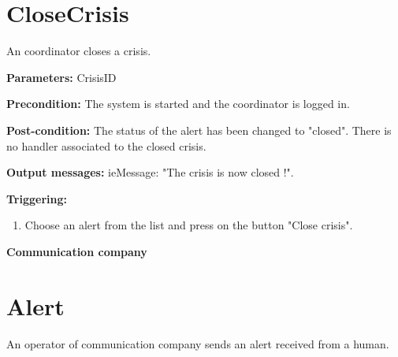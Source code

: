 \section{CloseCrisis}
\label{operation:CloseCrisis}

An coordinator closes a crisis.

\begin{description}
	\item \textbf{Parameters:} CrisisID
	\item \textbf{Precondition:} The system is started and the coordinator is
	logged in.
	\item \textbf{Post-condition:} The status of the alert has been changed to
	"closed". There is no handler associated to the closed crisis.
	\item \textbf{Output messages:} ieMessage: "The crisis is now closed !".
	
	\item \textbf{Triggering:}
	
	\begin{enumerate}
		\item Choose an alert from the list and press on the button "Close crisis".
	\end{enumerate}
\end{description}


\begin{center}
	{\bf \Large Communication company}
\end{center}

\section{Alert}
\label{operation:Alert}

An operator of communication company sends an alert received from a human.

